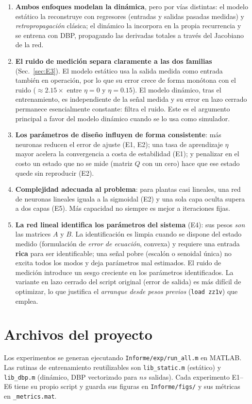 \documentclass[11pt,a4paper]{article}
\newcommand{\code}[1]{\texttt{\small #1}}
\begin{document}
\begin{enumerate}
  \item \textbf{Ambos enfoques modelan la dinámica}, pero por vías distintas: el modelo
  estático la reconstruye con regresores (entradas y salidas pasadas medidas) y
  \emph{retropropagación} clásica; el dinámico la incorpora en la propia recurrencia y se
  entrena con DBP, propagando las derivadas totales a través del Jacobiano de la red.

  \item \textbf{El ruido de medición separa claramente a las dos familias}
  (Sec.~\ref{sec:E3}). El modelo estático usa la salida medida como entrada también en
  operación, por lo que su error crece de forma monótona con el ruido ($\approx 2.15\times$
  entre $\eta=0$ y $\eta=0.15$). El modelo dinámico, tras el entrenamiento, es
  independiente de la señal medida y su error en lazo cerrado permanece esencialmente
  constante: filtra el ruido. Este es el argumento principal a favor del modelo dinámico
  cuando se lo usa como simulador.

  \item \textbf{Los parámetros de diseño influyen de forma consistente}: más neuronas
  reducen el error de ajuste (E1, E2); una tasa de aprendizaje $\eta$ mayor acelera la
  convergencia a costa de estabilidad (E1); y penalizar en el costo un estado que no se
  mide (matriz $Q$ con un cero) hace que ese estado quede sin reproducir (E2).

  \item \textbf{Complejidad adecuada al problema}: para plantas casi lineales, una red de
  neuronas lineales iguala a la sigmoidal (E2) y una sola capa oculta supera a dos capas
  (E5). Más capacidad no siempre es mejor a iteraciones fijas.

  \item \textbf{La red lineal identifica los parámetros del sistema} (E4): sus pesos
  \emph{son} las matrices $A$ y $B$. La identificación es limpia cuando se dispone del
  estado medido (formulación de \emph{error de ecuación}, convexa) y requiere una entrada
  \textbf{rica} para ser identificable; una señal pobre (escalón o senoidal única) no
  excita todos los modos y deja parámetros mal estimados. El ruido de medición introduce
  un sesgo creciente en los parámetros identificados. La variante en lazo cerrado del
  script original (error de salida) es más difícil de optimizar, lo que justifica el
  \emph{arranque desde pesos previos} (\code{load zz1v}) que emplea.
\end{enumerate}

\appendix
\section{Archivos del proyecto}
Los experimentos se generan ejecutando \code{Informe/exp/run\_all.m} en MATLAB. Las
rutinas de entrenamiento reutilizables son \code{lib\_static.m} (estático) y
\code{lib\_dbp.m} (dinámico, DBP vectorizado para $ns$ salidas). Cada experimento
E1--E6 tiene su propio script y guarda sus figuras en \code{Informe/figs/} y sus
métricas en \code{*\_metrics.mat}.
\end{document}
